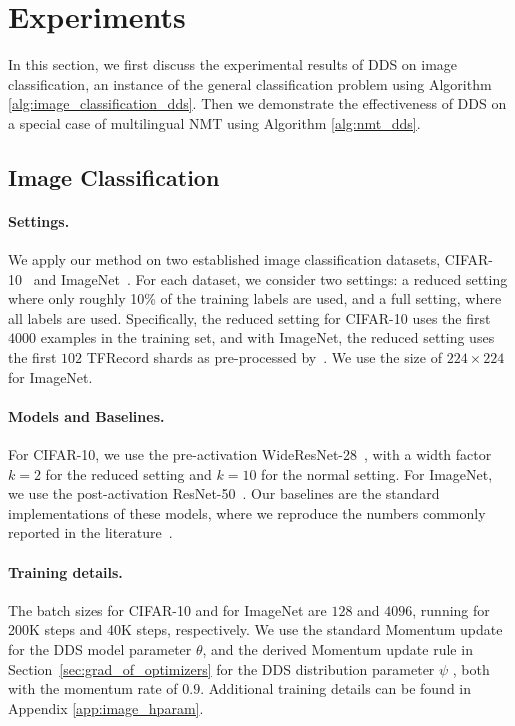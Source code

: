 \section{\label{sec:experiment}Experiments}
In this section, we first discuss the experimental results of DDS on image classification, an instance of the general classification problem using Algorithm \ref{alg:image_classification_dds}. Then we demonstrate the effectiveness of DDS on a special case of multilingual NMT using Algorithm \ref{alg:nmt_dds}.

\subsection{\label{exp:image_classification}Image Classification}

\paragraph{Settings.} We apply our method on two established image classification datasets, CIFAR-10~\citep{cifar10} and ImageNet~\citep{imagenet}. For each dataset, we consider two settings: a reduced setting where only roughly 10\% of the training labels are used, and a full setting, where all labels are used. Specifically, the reduced setting for CIFAR-10 uses the first $4000$ examples in the training set, and with ImageNet, the reduced setting uses the first $102$ TFRecord shards as pre-processed by~\citet{imagenet_generalize_better}. We use the size of $224 \times 224$ for ImageNet.

\paragraph{Models and Baselines.} For CIFAR-10, we use the pre-activation WideResNet-28~\citep{wide_res_net}, with a width factor $k=2$ for the reduced setting and $k=10$ for the normal setting. For ImageNet, we use the post-activation ResNet-50~\citep{res_net}. Our baselines are the standard implementations of these models, where we reproduce the numbers commonly reported in the literature~\citep{wide_res_net,res_net,resnext}.

\paragraph{Training details.} The batch sizes for CIFAR-10 and for ImageNet are $128$ and $4096$, running for 200K steps and 40K steps, respectively. We use the standard Momentum update for the DDS model parameter $\theta$, and the derived Momentum update rule in Section~\ref{sec:grad_of_optimizers} for the DDS distribution parameter $\psi$ 
, both with the momentum rate of $0.9$. Additional training details can be found in Appendix \ref{app:image_hparam}.

